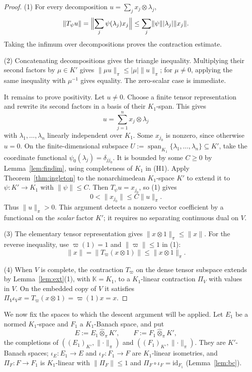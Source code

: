 \documentclass[11pt]{amsart}
\theoremstyle{definition}
\theoremstyle{remark}
\numberwithin{equation}{section}
\newcommand{\id}{\mathrm{id}}
\newcommand{\abs}[1]{\lvert #1\rvert}
\newcommand{\norm}[1]{\lVert #1\rVert}
\theoremstyle{plain}
\theoremstyle{definition}
\theoremstyle{plain}
\begin{document}
\begin{proof}
(1) For every decomposition $u=\sum_jx_j\otimes\lambda_j$,
\[
\norm{T_\psi u}=\Bigl\lVert\sum_j\psi(\lambda_j)x_j\Bigr\rVert
\le\sum_j\norm\psi\abs{\lambda_j}\norm{x_j}.
\]
Taking the infimum over decompositions proves the contraction estimate.

(2) Concatenating decompositions gives the triangle inequality. Multiplying their second factors by
$\mu\in K'$ gives $\norm{\mu u}_\pi\le\abs\mu\norm u_\pi$; for $\mu\ne0$, applying the same inequality with
$\mu^{-1}$ gives equality. The zero-scalar case is immediate.

It remains to prove positivity. Let $u\ne0$. Choose a finite tensor representation and rewrite its second
factors in a basis of their $K_1$\nobreakdash-span. This gives
\[
u=\sum_{j=1}^nx_j\otimes\lambda_j
\]
with $\lambda_1,\dots,\lambda_n$ linearly independent over $K_1$. Some $x_{j_0}$ is nonzero, since otherwise
$u=0$. On the finite-dimensional subspace $U:=\operatorname{span}_{K_1}\{\lambda_1,\dots,\lambda_n\}\subseteq K'$,
take the coordinate functional $\psi_0(\lambda_j)=\delta_{jj_0}$. It is bounded by some $C\ge0$ by
Lemma~\ref{lem:findim}, using completeness of $K_1$ in (H1). Apply Theorem~\ref{thm:ingleton} to the nonarchimedean
$K_1$\nobreakdash-space $K'$ to extend it to $\psi\colon K'\to K_1$ with $\norm\psi\le C$. Then
$T_\psi u=x_{j_0}$, so (1) gives
\[
0<\norm{x_{j_0}}\le C\norm u_\pi.
\]
Thus $\norm u_\pi>0$. This argument detects a nonzero vector coefficient by a functional on the \emph{scalar}
factor $K'$; it requires no separating continuous dual on $V$.

(3) The elementary tensor representation gives $\norm{x\otimes1}_\pi\le\norm x$. For the reverse inequality,
use $\varpi(1)=1$ and $\norm\varpi\le1$ in (1):
\[
\norm x=\norm{T_\varpi(x\otimes1)}\le\norm{x\otimes1}_\pi.
\]

(4) When $V$ is complete, the contraction $T_\varpi$ on the dense tensor subspace extends by
Lemma~\ref{lem:ext}(1), with $\mathbb K=K_1$, to a $K_1$\nobreakdash-linear contraction $\Pi_V$ with values in $V$.
On the embedded copy of $V$ it satisfies
$\Pi_V\iota_Vx=T_\varpi(x\otimes1)=\varpi(1)x=x$.
\end{proof}

We now fix the spaces to which the descent argument will be applied. Let $E_1$ be a normed $K_1$\nobreakdash-space
and $F_1$ a $K_1$\nobreakdash-Banach space, and put
\[
E:=E_1\widehat\otimes_\pi K',\qquad F:=F_1\widehat\otimes_\pi K',
\]
the completions of $((E_1)_{K'},\norm\cdot_\pi)$ and $((F_1)_{K'},\norm\cdot_\pi)$. They are $K'$\nobreakdash-Banach spaces;
$\iota_E\colon E_1\to E$ and $\iota_F\colon F_1\to F$ are $K_1$\nobreakdash-linear isometries, and $\Pi_F\colon F\to F_1$ is $K_1$\nobreakdash-linear
with $\norm{\Pi_F}\le1$ and $\Pi_F\circ\iota_F=\id_{F_1}$ (Lemma~\ref{lem:bc}).
\end{document}
